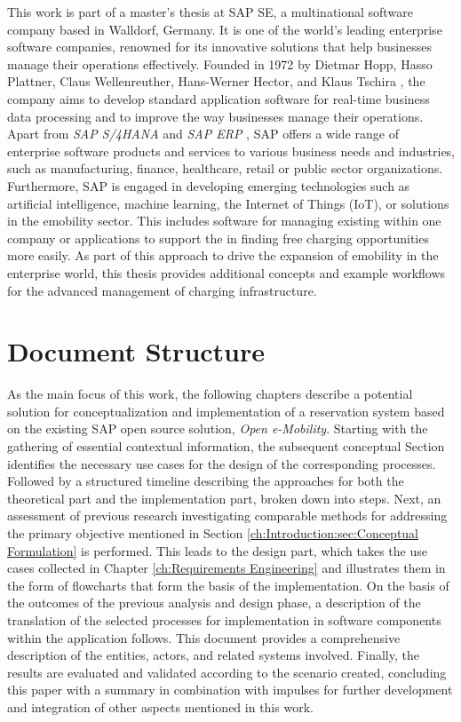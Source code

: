 This work is part of a master's thesis at SAP SE, a multinational software company based in Walldorf, Germany. 
It is one of the world's leading enterprise software companies, renowned for its innovative solutions that help businesses manage their operations effectively. 
Founded in 1972 by Dietmar Hopp, Hasso Plattner, Claus Wellenreuther, Hans-Werner Hector, and Klaus Tschira \cite{noauthor_inventing_nodate}, the company aims to develop standard application software for real-time business data processing and to improve the way businesses manage their operations. 
Apart from \textit{SAP S/4HANA} and \textit{SAP ERP} \cite{noauthor_sap_nodate}, SAP offers a wide range of enterprise software products and services to various business needs and industries, such as manufacturing, finance, healthcare, retail or public sector organizations.
Furthermore, SAP is engaged in developing emerging technologies such as artificial intelligence, machine learning, the Internet of Things (IoT), or solutions in the \acrshort{emobility} sector.
This includes software for managing existing  within one company or applications to support the  in finding free charging opportunities more easily. 
As part of this approach to drive the expansion of \acrshort{emobility} in the enterprise world, this thesis provides additional concepts and example workflows for the advanced management of charging infrastructure. 

\newpage

\section{Document Structure}
\label{ch:Introduction:Document Structure}

As the main focus of this work, the following chapters describe a potential solution for conceptualization and implementation of a reservation system based on the existing SAP open source solution, \textit{Open e-Mobility}. 
Starting with the gathering of essential contextual information, the subsequent conceptual Section identifies the necessary use cases for the design of the corresponding processes. 
Followed by a structured timeline describing the approaches for both the theoretical part and the implementation part, broken down into steps. 
Next, an assessment of previous research investigating comparable methods for addressing the primary objective mentioned in Section \ref{ch:Introduction:sec:Conceptual Formulation} is performed.
This leads to the design part, which takes the use cases collected in Chapter \ref{ch:Requirements Engineering} and illustrates them in the form of flowcharts that form the basis of the implementation. 
On the basis of the outcomes of the previous analysis and design phase, a description of the translation of the selected processes for implementation in software components within the application follows. This document provides a comprehensive description of the entities, actors, and related systems involved.
Finally, the results are evaluated and validated according to the scenario created, concluding this paper with a summary in combination with impulses for further development and integration of other aspects mentioned in this work.